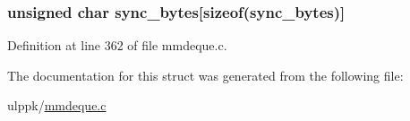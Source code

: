 \hypertarget{struct_m_m_d_q___p_a_c_k_e_t___h_e_a_d_e_r_a4b071bbf2d16a4bd21fb93a793379b29}{
\subsubsection[{sync\-\_\-bytes}]{\setlength{\rightskip}{0pt plus 5cm}unsigned char sync\-\_\-bytes\mbox{[}sizeof(sync\-\_\-bytes)\mbox{]}}}\label{struct_m_m_d_q___p_a_c_k_e_t___h_e_a_d_e_r_a4b071bbf2d16a4bd21fb93a793379b29}


Definition at line 362 of file mmdeque.\-c.



The documentation for this struct was generated from the following file\-:\begin{DoxyCompactItemize}
\item 
ulppk/\hyperlink{mmdeque_8c}{mmdeque.\-c}\end{DoxyCompactItemize}
